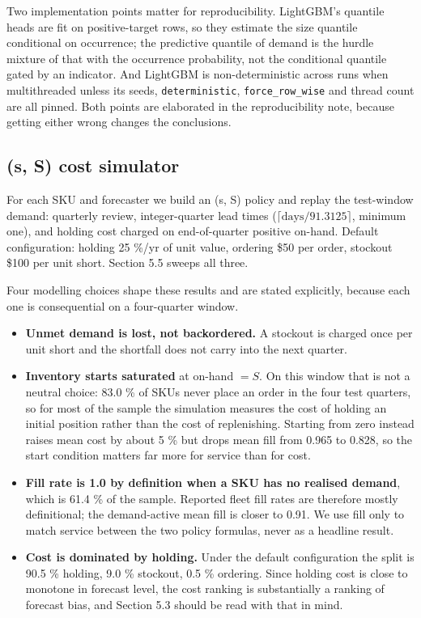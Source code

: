 \documentclass[11pt]{article}
\begin{document}
Two implementation points matter for reproducibility. LightGBM's quantile heads
are fit on positive-target rows, so they estimate the size quantile conditional
on occurrence; the predictive quantile of demand is the hurdle mixture of that
with the occurrence probability, not the conditional quantile gated by an
indicator. And LightGBM is non-deterministic across runs when multithreaded
unless its seeds, \texttt{deterministic}, \texttt{force\_row\_wise} and thread
count are all pinned. Both points are elaborated in the reproducibility note,
because getting either wrong changes the conclusions.

\subsection{(s, S) cost simulator}

For each SKU and forecaster we build an (s, S) policy and replay the
test-window demand: quarterly review, integer-quarter lead times
($\lceil \text{days}/91.3125 \rceil$, minimum one), and holding cost charged on
end-of-quarter positive on-hand. Default configuration: holding 25 \%/yr of
unit value, ordering \$50 per order, stockout \$100 per unit short. Section 5.5
sweeps all three.

Four modelling choices shape these results and are stated explicitly, because
each one is consequential on a four-quarter window.

\begin{itemize}
\item \textbf{Unmet demand is lost, not backordered.} A stockout is charged
  once per unit short and the shortfall does not carry into the next quarter.
\item \textbf{Inventory starts saturated} at on-hand $=S$. On this window that
  is not a neutral choice: 83.0 \% of SKUs never place an order in the four
  test quarters, so for most of the sample the simulation measures the cost of
  holding an initial position rather than the cost of replenishing. Starting
  from zero instead raises mean cost by about 5 \% but drops mean fill from
  0.965 to 0.828, so the start condition matters far more for service than for
  cost.
\item \textbf{Fill rate is 1.0 by definition when a SKU has no realised
  demand}, which is 61.4 \% of the sample. Reported fleet fill rates are
  therefore mostly definitional; the demand-active mean fill is closer to 0.91.
  We use fill only to match service between the two policy formulas, never as a
  headline result.
\item \textbf{Cost is dominated by holding.} Under the default configuration
  the split is 90.5 \% holding, 9.0 \% stockout, 0.5 \% ordering. Since holding
  cost is close to monotone in forecast level, the cost ranking is
  substantially a ranking of forecast bias, and Section 5.3 should be read with
  that in mind.
\end{itemize}
\end{document}
